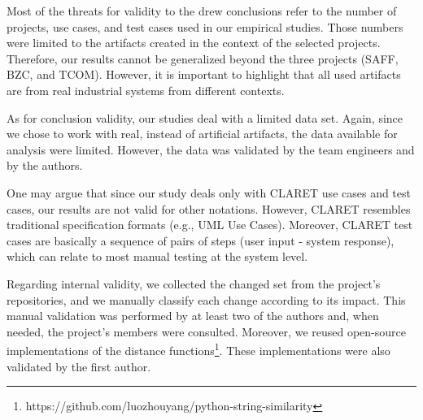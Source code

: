 Most of the threats for validity to the drew conclusions refer to the number of projects, use cases, and test cases used in our empirical studies. Those numbers were limited to the artifacts created in the context of the selected projects. Therefore, our results cannot be generalized beyond the three projects (SAFF, BZC, and TCOM). However, it is important to highlight that all used artifacts are from real industrial systems from different contexts. 

As for conclusion validity, our studies deal with
a limited data set. Again, since we chose to work with real, instead of artificial artifacts, the data available for analysis were limited. However, the data was validated by the team engineers
and by the authors. 

One may argue that since our study deals only with CLARET use cases and test cases, our results are not valid for other notations. However, CLARET resembles traditional specification formats (e.g., UML Use Cases). Moreover, CLARET test cases are basically a sequence of pairs of steps (user input - system response), which can relate to most manual testing at the system level.

Regarding internal validity, we collected the changed set from the project's repositories, and we manually classify each change according to its impact. This manual validation was performed by at least two of the authors and, when needed, the project’s members were consulted. Moreover, we reused open-source implementations of the distance functions\footnote{https://github.com/luozhouyang/python-string-similarity}. These implementations were also validated by the first author.
